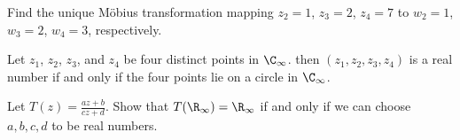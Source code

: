 \begin{exercise}
	Find the unique Möbius transformation mapping $z_2 = 1$, $z_3 = 2$, $z_4 = 7$ to $w_2 = 1$, $w_3 = 2$, $w_4 = 3$, respectively.
\end{exercise}

\begin{proposition}\label{prop2.6}
	Let $z_1$, $z_2$, $z_3$, and $z_4$ be four distinct points in $\C_\infty$.
	then $(z_1, z_2, z_3, z_4)$ is a real number if and only if the four points lie on a circle in $\C_\infty$.
\end{proposition}

\begin{exercise}
	Let $\displaystyle T(z) = \frac{a z + b}{c z + d}$.
	Show that $T(\R_\infty) = \R_\infty$ if and only if we can choose $a, b, c, d$ to be real numbers.
\end{exercise}
